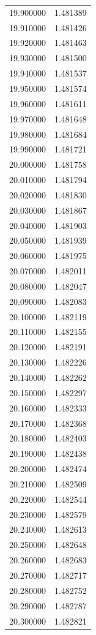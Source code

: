 \begin{tabular}{rr}
19.900000 & 1.481389 \\
19.910000 & 1.481426 \\
19.920000 & 1.481463 \\
19.930000 & 1.481500 \\
19.940000 & 1.481537 \\
19.950000 & 1.481574 \\
19.960000 & 1.481611 \\
19.970000 & 1.481648 \\
19.980000 & 1.481684 \\
19.990000 & 1.481721 \\
20.000000 & 1.481758 \\
20.010000 & 1.481794 \\
20.020000 & 1.481830 \\
20.030000 & 1.481867 \\
20.040000 & 1.481903 \\
20.050000 & 1.481939 \\
20.060000 & 1.481975 \\
20.070000 & 1.482011 \\
20.080000 & 1.482047 \\
20.090000 & 1.482083 \\
20.100000 & 1.482119 \\
20.110000 & 1.482155 \\
20.120000 & 1.482191 \\
20.130000 & 1.482226 \\
20.140000 & 1.482262 \\
20.150000 & 1.482297 \\
20.160000 & 1.482333 \\
20.170000 & 1.482368 \\
20.180000 & 1.482403 \\
20.190000 & 1.482438 \\
20.200000 & 1.482474 \\
20.210000 & 1.482509 \\
20.220000 & 1.482544 \\
20.230000 & 1.482579 \\
20.240000 & 1.482613 \\
20.250000 & 1.482648 \\
20.260000 & 1.482683 \\
20.270000 & 1.482717 \\
20.280000 & 1.482752 \\
20.290000 & 1.482787 \\
20.300000 & 1.482821 \\

\end{tabular}
